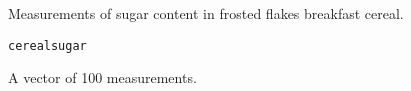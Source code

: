 \begin{Description}\relax
Measurements of sugar content in frosted flakes breakfast cereal.
\end{Description}
\begin{Usage}
\begin{verbatim}cerealsugar\end{verbatim}
\end{Usage}
\begin{Format}\relax
A vector of 100 measurements.
\end{Format}


